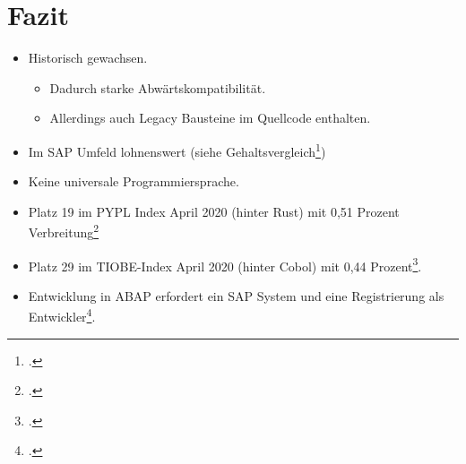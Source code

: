 \section{Fazit}
\begin{itemize}
    \item Historisch gewachsen.
    \begin{itemize}
        \item Dadurch starke Abwärtskompatibilität.
        \item Allerdings auch Legacy Bausteine im Quellcode enthalten.
    \end{itemize}
    \item Im SAP Umfeld lohnenswert (siehe Gehaltsvergleich\footcite[Vgl.][S, 68]{zimmermannSTEPSTONEGEHALTSREPORT2020})
    \item Keine universale Programmiersprache.
    \item Platz 19 im PYPL Index April 2020 (hinter Rust) mit 0,51 Prozent Verbreitung\footcite[Vgl.][]{PYPLPopularitYProgramming}
    \item Platz 29 im TIOBE-Index April 2020 (hinter Cobol) mit 0,44 Prozent\footcite[Vgl.][]{IndexTIOBESoftware}.
    \item Entwicklung in ABAP erfordert ein SAP System und eine Registrierung als Entwickler\footcite[Vgl.][]{sapagKeys}. %
\end{itemize}